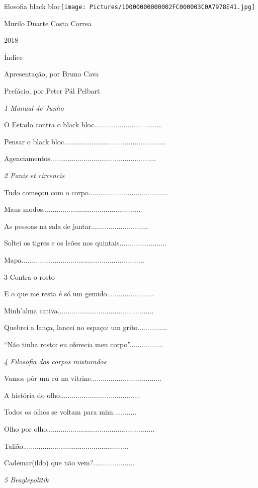 filosofia black
bloc\texttt{[image: Pictures/10000000000002FC000003C0A7978E41.jpg]}

Murilo Duarte Costa Correa

2018

Índice

Apresentação, por Bruno Cava

Prefácio, por Peter Pál Pelbart

\emph{1 Manual de Junho}

O Estado contra o black bloc...................................

\emph{}Pensar o black
bloc....................................................

Agenciamentos......................................................

\emph{2 Panis et circencis}

Tudo começou com o corpo.........................................

Maus modos..................................................

As pessoas na sala de jantar.............................

Soltei os tigres e os leões nos quintais........................

Mapa...............................................................

3 Contra o rosto

E o que me resta é só um gemido........................

Minh'alma cativa.................................................

Quebrei a lança, lancei no espaço: um grito...............

``Não tinha rosto: eu oferecia meu corpo''.................

\emph{4 Filosofia dos corpos misturados}

Vamos pôr um cu na vitrine....................................

A história do olho.........................................

Todos os olhos se voltam para mim............

Olho por olho.......................................................

Talião......................................................

Cademar(ildo) que não vem?.....................

\emph{5 Beaglepolitik}

